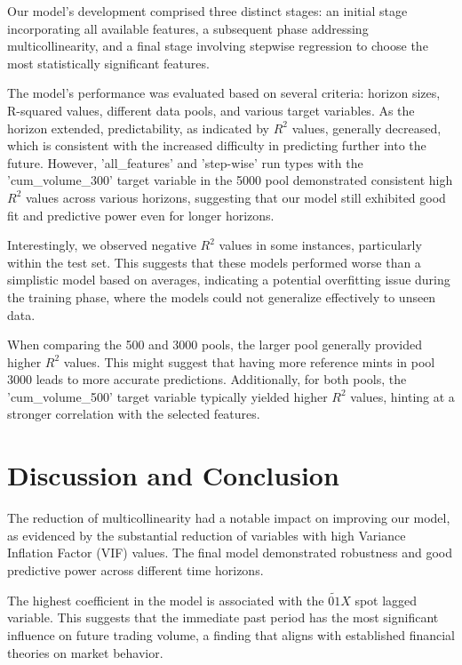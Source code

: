 \documentclass{article}
\begin{document}
Our model's development comprised three distinct stages: an initial stage incorporating all available features, a subsequent phase addressing multicollinearity, and a final stage involving stepwise regression to choose the most statistically significant features.

The model's performance was evaluated based on several criteria: horizon sizes, R-squared values, different data pools, and various target variables. As the horizon extended, predictability, as indicated by \( R^2 \) values, generally decreased, which is consistent with the increased difficulty in predicting further into the future. However, 'all\_features' and 'step-wise' run types with the 'cum\_volume\_300' target variable in the 5000 pool demonstrated consistent high \( R^2 \) values across various horizons, suggesting that our model still exhibited good fit and predictive power even for longer horizons.

Interestingly, we observed negative \( R^2 \) values in some instances, particularly within the test set. This suggests that these models performed worse than a simplistic model based on averages, indicating a potential overfitting issue during the training phase, where the models could not generalize effectively to unseen data.

When comparing the 500 and 3000 pools, the larger pool generally provided higher \( R^2 \) values. This might suggest that having more reference mints in pool 3000 leads to more accurate predictions. Additionally, for both pools, the 'cum\_volume\_500' target variable typically yielded higher \( R^2 \) values, hinting at a stronger correlation with the selected features.

\section{\textbf{Discussion and Conclusion}}

The reduction of multicollinearity had a notable impact on improving our model, as evidenced by the substantial reduction of variables with high Variance Inflation Factor (VIF) values. The final model demonstrated robustness and good predictive power across different time horizons.

The highest coefficient in the model is associated with the \(\widetilde{01}X\) spot lagged variable. This suggests that the immediate past period has the most significant influence on future trading volume, a finding that aligns with established financial theories on market behavior.
\end{document}

